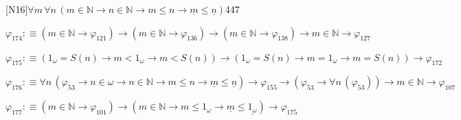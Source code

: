 \begin{fullproof}{[N16]}{$\forall m\,\forall n\,(m \in \mathbb{N} \to n \in \mathbb{N} \to m \leq n \to \underline{m} \leq \underline{n})$}{447}
\begin{abbrevlist}
\item $\varphi_{174} :\equiv (m \in \mathbb{N} \to \varphi_{121}) \to (m \in \mathbb{N} \to \varphi_{136}) \to (m \in \mathbb{N} \to \varphi_{138}) \to m \in \mathbb{N} \to \varphi_{127}$
\item $\varphi_{175} :\equiv (1_{\omega} = S(n) \to m < 1_{\omega} \to m < S(n)) \to (1_{\omega} = S(n) \to m = 1_{\omega} \to m = S(n)) \to \varphi_{172}$
\item $\varphi_{176} :\equiv \forall n\,(\varphi_{53} \to n \in \omega \to n \in \mathbb{N} \to m \leq n \to \underline{m} \leq \underline{n}) \to \varphi_{155} \to (\varphi_{53} \to \forall n\,(\varphi_{53})) \to m \in \mathbb{N} \to \varphi_{107}$
\item $\varphi_{177} :\equiv (m \in \mathbb{N} \to \varphi_{101}) \to (m \in \mathbb{N} \to m \leq 1_{\omega} \to \underline{m} \leq \underline{1_{\omega}}) \to \varphi_{175}$
\end{abbrevlist}
\end{fullproof}
